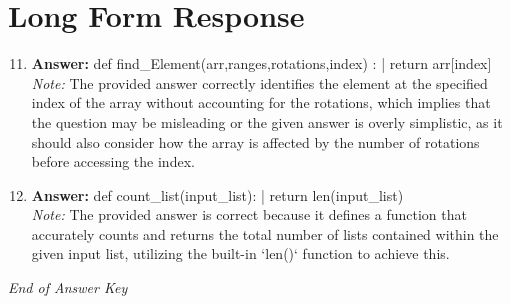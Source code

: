 \documentclass[12pt]{article}
\begin{document}
\section*{Long Form Response}
\begin{enumerate}[label=\arabic*.]
\setcounter{enumi}{10}
\item \textbf{Answer:} def find\_Element(arr,ranges,rotations,index) : | return arr[index]
\\ \textit{Note:} The provided answer correctly identifies the element at the specified index of the array without accounting for the rotations, which implies that the question may be misleading or the given answer is overly simplistic, as it should also consider how the array is affected by the number of rotations before accessing the index.
\item \textbf{Answer:} def count\_list(input\_list): | return len(input\_list)
\\ \textit{Note:} The provided answer is correct because it defines a function that accurately counts and returns the total number of lists contained within the given input list, utilizing the built-in `len()` function to achieve this.
\end{enumerate}

\vfill
\noindent\textit{End of Answer Key}
\end{document}
